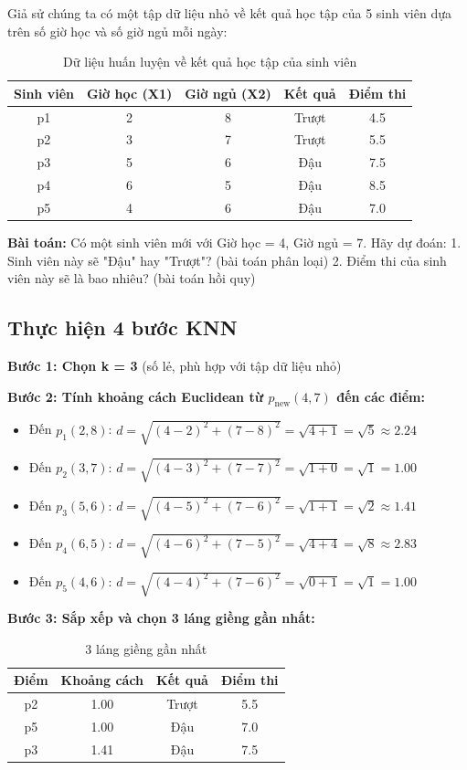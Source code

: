 Giả sử chúng ta có một tập dữ liệu nhỏ về kết quả học tập của 5 sinh viên dựa trên số giờ học và số giờ ngủ mỗi ngày:

\begin{table}[H]
\centering
\begin{tabular}{|c|c|c|c|c|}
\hline
\textbf{Sinh viên} & \textbf{Giờ học (X1)} & \textbf{Giờ ngủ (X2)} & \textbf{Kết quả} & \textbf{Điểm thi} \\
\hline
p1 & 2 & 8 & Trượt & 4.5 \\
p2 & 3 & 7 & Trượt & 5.5 \\
p3 & 5 & 6 & Đậu & 7.5 \\
p4 & 6 & 5 & Đậu & 8.5 \\
p5 & 4 & 6 & Đậu & 7.0 \\
\hline
\end{tabular}
\caption{Dữ liệu huấn luyện về kết quả học tập của sinh viên}
\end{table}

\textbf{Bài toán:} Có một sinh viên mới với Giờ học = 4, Giờ ngủ = 7. Hãy dự đoán:
1. Sinh viên này sẽ "Đậu" hay "Trượt"? (bài toán phân loại)
2. Điểm thi của sinh viên này sẽ là bao nhiêu? (bài toán hồi quy)

\subsection{Thực hiện 4 bước KNN}

\textbf{Bước 1: Chọn k = 3} (số lẻ, phù hợp với tập dữ liệu nhỏ)

\textbf{Bước 2: Tính khoảng cách Euclidean từ $p_{\text{new}}(4,7)$ đến các điểm:}

\begin{itemize}
    \item Đến $p_1(2,8)$: $d = \sqrt{(4 - 2)^2 + (7 - 8)^2} = \sqrt{4 + 1} = \sqrt{5} \approx 2.24$
    \item Đến $p_2(3,7)$: $d = \sqrt{(4 - 3)^2 + (7 - 7)^2} = \sqrt{1 + 0} = \sqrt{1} = 1.00$
    \item Đến $p_3(5,6)$: $d = \sqrt{(4 - 5)^2 + (7 - 6)^2} = \sqrt{1 + 1} = \sqrt{2} \approx 1.41$
    \item Đến $p_4(6,5)$: $d = \sqrt{(4 - 6)^2 + (7 - 5)^2} = \sqrt{4 + 4} = \sqrt{8} \approx 2.83$
    \item Đến $p_5(4,6)$: $d = \sqrt{(4 - 4)^2 + (7 - 6)^2} = \sqrt{0 + 1} = \sqrt{1} = 1.00$
\end{itemize}

\textbf{Bước 3: Sắp xếp và chọn 3 láng giềng gần nhất:}
\begin{table}[H]
\centering
\begin{tabular}{|c|c|c|c|}
\hline
\textbf{Điểm} & \textbf{Khoảng cách} & \textbf{Kết quả} & \textbf{Điểm thi} \\
\hline
p2 & 1.00 & Trượt & 5.5 \\
p5 & 1.00 & Đậu & 7.0 \\
p3 & 1.41 & Đậu & 7.5 \\
\hline
\end{tabular}
\caption{3 láng giềng gần nhất}
\end{table}


